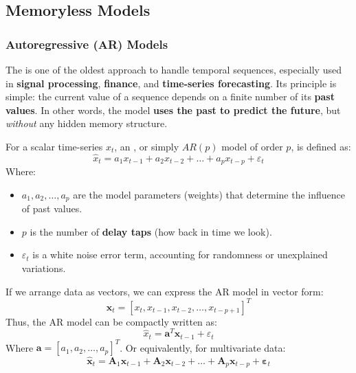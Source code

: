 \subsection{Memoryless Models}

\subsubsection{Autoregressive (AR) Models}\label{sec:autoregressive-models}

The  is one of the oldest approach to handle temporal sequences, especially used in \textbf{signal processing}, \textbf{finance}, and \textbf{time-series forecasting}. Its principle is simple: the current value of a sequence depends on a finite number of its \textbf{past values}. In other words, the model \textbf{uses the past to predict the future}, but \emph{without} any hidden memory structure.

\highspace
\begin{definitionbox}
    For a scalar time-series $x_t$, an , or simply $AR(p)$ model of order $p$, is defined as:
    \begin{equation}
        \hat{x}_t = a_1 x_{t-1} + a_2 x_{t-2} + \ldots + a_p x_{t-p} + \varepsilon_t
    \end{equation}
    Where:
    \begin{itemize}
        \item $a_1, a_2, \ldots, a_p$ are the model parameters (weights) that determine the influence of past values.
        \item $p$ is the number of \textbf{delay taps} (how back in time we look).
        \item $\varepsilon_t$ is a white noise error term, accounting for randomness or unexplained variations.
    \end{itemize}
    If we arrange data as vectors, we can express the AR model in vector form:
    \begin{equation*}
        \mathbf{x}_t = \left[x_t, x_{t-1}, x_{t-2}, \ldots, x_{t-p+1}\right]^{T}
    \end{equation*}
    Thus, the AR model can be compactly written as:
    \begin{equation}
        \hat{x}_t = \mathbf{a}^{T} \mathbf{x}_{t-1} + \varepsilon_t
    \end{equation}
    Where $\mathbf{a} = [a_1, a_2, \ldots, a_p]^{T}$. Or equivalently, for multivariate data:
    \begin{equation*}
        \hat{\mathbf{x}}_t = \mathbf{A}_1 \mathbf{x}_{t-1} + \mathbf{A}_2 \mathbf{x}_{t-2} + \ldots + \mathbf{A}_p \mathbf{x}_{t-p} + \boldsymbol{\varepsilon}_t
    \end{equation*}
\end{definitionbox}

